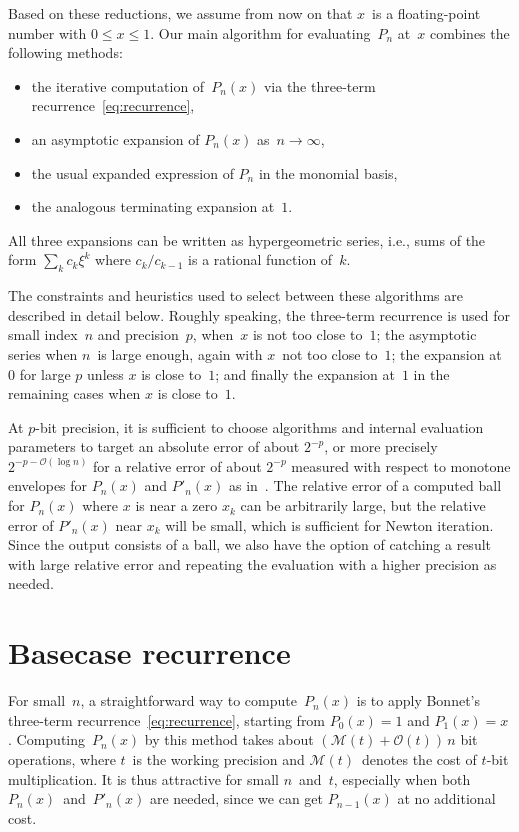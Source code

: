 \documentclass{siamart0216}
\newcommand{\OO}{\mathcal{O}}
\newcommand{\MM}{\mathcal{M}}
\begin{document}
Based on these reductions, we assume from now on that $x$~is a
floating-point number with $0 \leq x \leq 1$.
Our main algorithm for evaluating~$P_n$ at~$x$ combines the following
methods:
\begin{itemize}
  \item the iterative computation of~$P_n(x)$
  via the three-term recurrence~\eqref{eq:recurrence},
  \item an asymptotic expansion of $P_n(x)$ as~$n \to \infty$,
  \item the usual expanded expression of $P_n$ in the monomial basis,
  \item the analogous terminating expansion at~$1$.
\end{itemize}
All three expansions can be written as hypergeometric
series, i.e., sums of the form $\sum_k c_k \xi^k$ where $c_k/c_{k-1}$
is a rational function of~$k$.

The constraints and heuristics used to select between these algorithms
are described in detail below.
Roughly speaking,
the three-term recurrence is used for small index~$n$ and precision~$p$, when~$x$
is not too close to~$1$;
the asymptotic series when $n$~is large enough, again with $x$~not too
close to~$1$;
the expansion at~$0$ for large $p$ unless $x$ is close to~$1$;
and finally the expansion at~$1$ in the remaining cases
when $x$ is close to~$1$.

At $p$-bit precision, it is sufficient to choose algorithms
and internal evaluation parameters to target
an absolute error of about $2^{-p}$, or more precisely $2^{-p-\OO(\log n)}$
for a relative error of about $2^{-p}$ measured with respect
to monotone envelopes for $P_n(x)$ and $P'_n(x)$ as in~\cite{Bogaert2012}.
The relative error of a computed ball for $P_n(x)$ where $x$ is near a zero $x_k$
can be arbitrarily large, but the relative error of $P'_n(x)$ near $x_k$
will be small, which is sufficient for Newton iteration.
Since the output consists of a ball, we also have the option of catching
a result with large relative error and repeating the evaluation with a
higher precision as needed.

\section{Basecase recurrence}

\label{sec:recurrence}

For small $n$, a straightforward way to compute~$P_n(x)$ is to apply
Bonnet's three-term recurrence \eqref{eq:recurrence},
starting from $P_0(x)=1$ and $P_1(x) = x$.
Computing~$P_n(x)$ by this method takes about $(\MM(t) + \OO(t))\, n$
bit operations, where $t$ is the working precision and $\MM(t)$ denotes the
cost of $t$-bit multiplication.
It is thus attractive for small $n$ and $t$, especially when both
$P_n(x)$ and $P'_n(x)$ are needed, since we can get $P_{n-1}(x)$ at no
additional cost.
\end{document}
